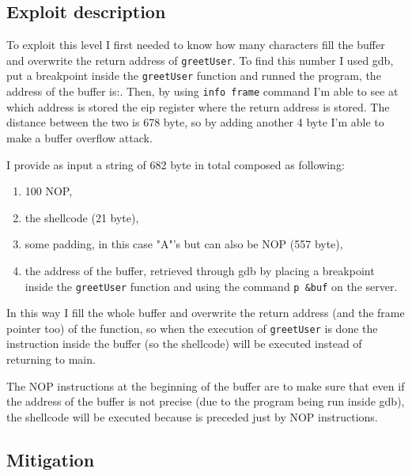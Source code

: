 \documentclass[a4paper,12pt]{article}
\begin{document}
\subsection{Exploit description}

To exploit this level I first needed to know how many characters fill the buffer and overwrite the return address of \texttt{greetUser}. To find this number I used gdb, put a breakpoint inside the \texttt{greetUser} function and runned the program, the address of the buffer is:. Then, by using \texttt{info frame} command I'm able to see at which address is stored the eip register where the return address is stored. The distance between the two is 678 byte, so by adding another 4 byte I'm able to make a buffer overflow attack.

I provide as input a string of 682 byte in total composed as following:
\begin{enumerate}
\item 100 NOP,
\item the shellcode (21 byte),
\item some padding, in this case "A"'s but can also be NOP (557 byte),
\item the address of the buffer, retrieved through gdb by placing a breakpoint inside the \texttt{greetUser} function and using the command \texttt{p \&buf} on the server.
\end{enumerate}


In this way I fill the whole buffer and overwrite the return address (and the frame pointer too) of the function, so when the execution of \texttt{greetUser} is done the instruction inside the buffer (so the shellcode) will be executed instead of returning to main. 

The NOP instructions at the beginning of the buffer are to make sure that even if the address of the buffer is not precise (due to the program being run inside gdb), the shellcode will be executed because is preceded just by NOP instructions.


\subsection{Mitigation}
\end{document}
